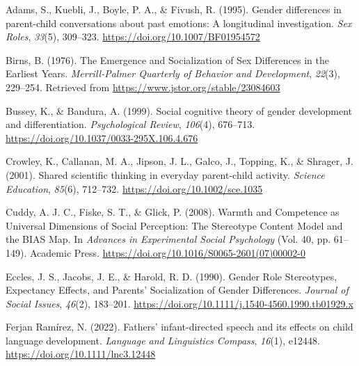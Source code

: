 \documentclass[
  man]{apa6}
\newlength{\cslhangindent}
\newlength{\cslentryspacingunit} %
\newenvironment{CSLReferences}[2] %
 {%
  \setlength{\parindent}{0pt}
  \ifodd #1
  \let\oldpar\par
  \def\par{\hangindent=\cslhangindent\oldpar}
  \fi
  \setlength{\parskip}{#2\cslentryspacingunit}
 }%
 {}
\begin{document}
\hypertarget{refs}{}
\begin{CSLReferences}{1}{0}
\leavevmode{}%
Adams, S., Kuebli, J., Boyle, P. A., \& Fivush, R. (1995). Gender differences in parent-child conversations about past emotions: {A} longitudinal investigation. \emph{Sex Roles}, \emph{33}(5), 309--323. \url{https://doi.org/10.1007/BF01954572}

\leavevmode{}%
Birns, B. (1976). The {Emergence} and {Socialization} of {Sex Differences} in the {Earliest Years}. \emph{Merrill-Palmer Quarterly of Behavior and Development}, \emph{22}(3), 229--254. Retrieved from \url{https://www.jstor.org/stable/23084603}

\leavevmode{}%
Bussey, K., \& Bandura, A. (1999). Social cognitive theory of gender development and differentiation. \emph{Psychological Review}, \emph{106}(4), 676--713. \url{https://doi.org/10.1037/0033-295X.106.4.676}

\leavevmode{}%
Crowley, K., Callanan, M. A., Jipson, J. L., Galco, J., Topping, K., \& Shrager, J. (2001). Shared scientific thinking in everyday parent-child activity. \emph{Science Education}, \emph{85}(6), 712--732. \url{https://doi.org/10.1002/sce.1035}

\leavevmode{}%
Cuddy, A. J. C., Fiske, S. T., \& Glick, P. (2008). Warmth and {Competence} as {Universal Dimensions} of {Social Perception}: {The Stereotype Content Model} and the {BIAS Map}. In \emph{Advances in {Experimental Social Psychology}} (Vol. 40, pp. 61--149). {Academic Press}. \url{https://doi.org/10.1016/S0065-2601(07)00002-0}

\leavevmode{}%
Eccles, J. S., Jacobs, J. E., \& Harold, R. D. (1990). Gender {Role Stereotypes}, {Expectancy Effects}, and {Parents}' {Socialization} of {Gender Differences}. \emph{Journal of Social Issues}, \emph{46}(2), 183--201. \url{https://doi.org/10.1111/j.1540-4560.1990.tb01929.x}

\leavevmode{}%
Ferjan Ramírez, N. (2022). Fathers' infant-directed speech and its effects on child language development. \emph{Language and Linguistics Compass}, \emph{16}(1), e12448. \url{https://doi.org/10.1111/lnc3.12448}


\end{CSLReferences}
\end{document}
